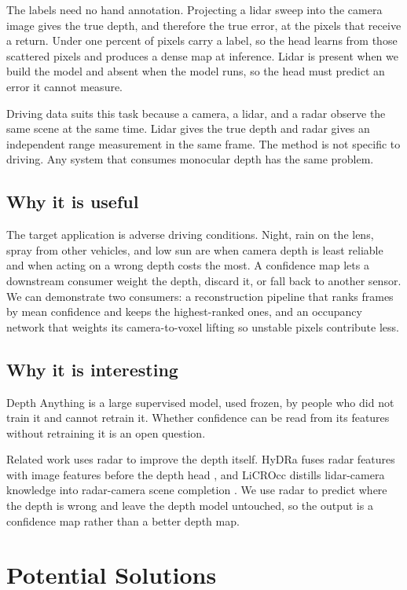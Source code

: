\documentclass[11pt]{article}
\begin{document}
The labels need no hand annotation. Projecting a lidar sweep into the camera image gives the true depth, and therefore the true error, at the pixels that receive a return. Under one percent of pixels carry a label, so the head learns from those scattered pixels and produces a dense map at inference. Lidar is present when we build the model and absent when the model runs, so the head must predict an error it cannot measure.

Driving data suits this task because a camera, a lidar, and a radar observe the same scene at the same time. Lidar gives the true depth and radar gives an independent range measurement in the same frame. The method is not specific to driving. Any system that consumes monocular depth has the same problem.

\subsection{Why it is useful}

The target application is adverse driving conditions. Night, rain on the lens, spray from other vehicles, and low sun are when camera depth is least reliable and when acting on a wrong depth costs the most. A confidence map lets a downstream consumer weight the depth, discard it, or fall back to another sensor. We can demonstrate two consumers: a reconstruction pipeline that ranks frames by mean confidence and keeps the highest-ranked ones, and an occupancy network that weights its camera-to-voxel lifting so unstable pixels contribute less.

\subsection{Why it is interesting}

Depth Anything is a large supervised model, used frozen, by people who did not train it and cannot retrain it. Whether confidence can be read from its features without retraining it is an open question.

Related work uses radar to improve the depth itself. HyDRa fuses radar features with image features before the depth head \citep{wolters2025hydra}, and LiCROcc distills lidar-camera knowledge into radar-camera scene completion \citep{ma2024licrocc}. We use radar to predict where the depth is wrong and leave the depth model untouched, so the output is a confidence map rather than a better depth map.

\section{Potential Solutions}
\end{document}
